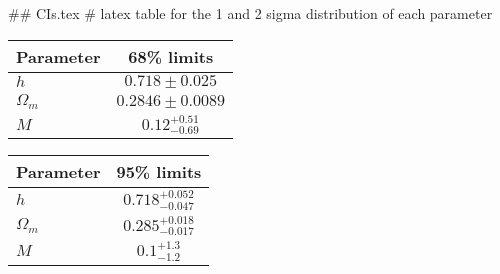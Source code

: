 ## CIs.tex
# latex table for the 1 and 2 sigma distribution of each parameter

\begin{tabular} { l  c}
 Parameter &  68\% limits\\
\hline
{\boldmath$h              $} & $0.718\pm 0.025            $\\
{\boldmath$\Omega_m       $} & $0.2846\pm 0.0089          $\\
{\boldmath$M              $} & $0.12^{+0.51}_{-0.69}      $\\
\hline
\end{tabular}

\begin{tabular} { l  c}
 Parameter &  95\% limits\\
\hline
{\boldmath$h              $} & $0.718^{+0.052}_{-0.047}   $\\
{\boldmath$\Omega_m       $} & $0.285^{+0.018}_{-0.017}   $\\
{\boldmath$M              $} & $0.1^{+1.3}_{-1.2}         $\\
\hline
\end{tabular}
